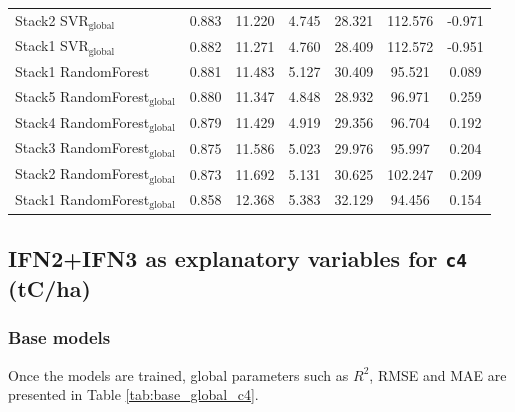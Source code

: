 \begin{table}[tp]
{\begin{tabular}{p{4.5cm}cccccc}
        Stack2 SVR$_{\text{global}}$ & 0.883 & 11.220 & 4.745 & 28.321 & 112.576 & -0.971 \\
        Stack1 SVR$_{\text{global}}$ & 0.882 & 11.271 & 4.760 & 28.409 & 112.572 & -0.951 \\
        Stack1 RandomForest & 0.881 & 11.483 & 5.127 & 30.409 & 95.521 & 0.089 \\
        Stack5 RandomForest$_{\text{global}}$ & 0.880 & 11.347 & 4.848 & 28.932 & 96.971 & 0.259 \\
        Stack4 RandomForest$_{\text{global}}$ & 0.879 & 11.429 & 4.919 & 29.356 & 96.704 & 0.192 \\
        Stack3 RandomForest$_{\text{global}}$ & 0.875 & 11.586 & 5.023 & 29.976 & 95.997 & 0.204 \\
        Stack2 RandomForest$_{\text{global}}$ & 0.873 & 11.692 & 5.131 & 30.625 & 102.247 & 0.209 \\
        Stack1 RandomForest$_{\text{global}}$ & 0.858 & 12.368 & 5.383 & 32.129 & 94.456 & 0.154 \\
            \bottomrule
    \end{tabular}
    }
\end{table}


\clearpage
\subsection{IFN2+IFN3 as explanatory variables for \texttt{c4} (tC/ha)}

\subsubsection{Base models}

Once the models are trained, global parameters such as $R^2$, RMSE and MAE are presented in Table \ref{tab:base_global_c4}.

